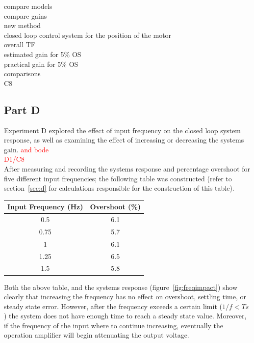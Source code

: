 \documentclass[11pt,a4paper]{article}
\begin{document}
compare models\\
compare gains\\
new method\\



closed loop control system for the position of the motor\\
overall TF\\
estimated gain for 5\% OS\\
practical gain for 5\% OS\\
comparisons\\
C8\\








\pagebreak
\subsection{Part D}
Experiment D explored the effect of input frequency on the closed loop system response, as well as examining the effect of increasing or decreasing the systems gain. \textcolor{red}{and bode}\\
  
\textcolor{red}{D1/C8} \\

After measuring and recording the systems response and percentage overshoot for five different input frequencies; the following table was constructed (refer to section~\ref{sec:d} for calculations responsible for the construction of this table). 

\begin{center}
    \begin{tabular}{| c | c |}
    \hline
    Input Frequency (Hz)  & Overshoot (\%)  \\ \hline
    0.5  	                  & 6.1  		\\ \hline
	0.75  	                  & 5.7  		\\ \hline
	1		                  & 6.1 		\\ \hline
	1.25	                  & 6.5 		\\ \hline
	1.5		                  & 5.8 		\\
    \hline
    \end{tabular}
\end{center}
 
Both the above table, and the systems response (figure~\ref{fig:freqimpact}) show clearly that increasing the frequency has no effect on overshoot, settling time, or steady state error. However, after the frequency exceeds a certain limit (\textbf{$1/f < Ts$}) the system does not have enough time to reach a steady state value. Moreover, if the frequency of the input where to continue increasing, eventually the operation amplifier will begin attenuating the output voltage. 
\end{document}
